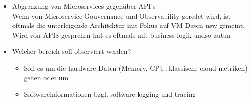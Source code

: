 \begin{itemize}
	\item Abgrenzung von Microservices gegenüber API's \\
	Wenn von Microservice Gouvernance und Observability geredet wird, ist oftmals die unterleigende Architektur mit Fokus auf VM-Daten usw gemeint. Wird von APIS gesprchen hat es oftmals mit business logik undso zutun
\end{itemize}
\begin{itemize}
	\item Welcher bereich soll observiert werden?
	\begin{itemize}
		\item Soll es um die hardware Daten (Memory, CPU, klassische cloud metriken) gehen oder um
		\item Softwareinformationen bzgl. software logging und tracing
	\end{itemize}
\end{itemize}
